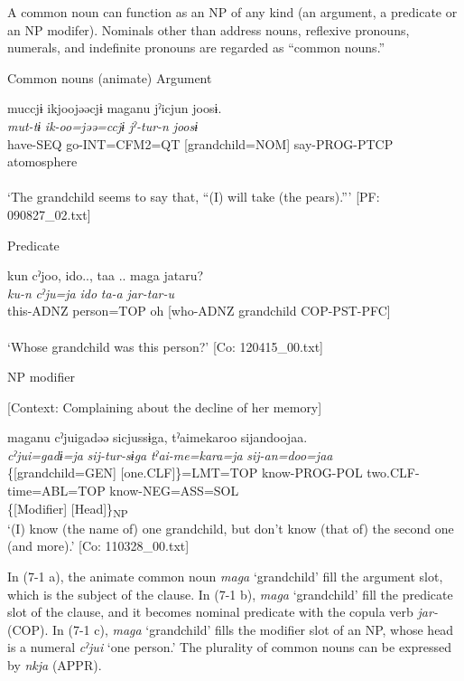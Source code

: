 A common noun can function as an NP of any kind (an argument, a predicate or an NP modifer). Nominals other than address nouns, reflexive pronouns, numerals, and indefinite pronouns are regarded as “common nouns.”

\ea \label{ex:7:1}  Common nouns (animate)
\ea \label{ex:7:a}Argument

\gllll  muccjɨ  ikjoojəəcjɨ  maganu  jˀicjun   joosɨ.\\
\textit{mut-tɨ}  \textit{ik-oo=jəə=ccjɨ}  \textit{}  \textit{jˀ-tur-n}   \textit{joosɨ}\\
have-SEQ  go-INT=CFM2=QT  [grandchild=NOM]  say-PROG-PTCP atomosphere\\
[Subject]  \\
\glt ‘The grandchild seems to say that, “(I) will take (the pears).”’ [PF: 090827\_02.txt]

\ex \label{ex:7:b}Predicate

\gllll  kun  cˀjoo,  ido..,  taa ..  maga   jataru?\\
\textit{ku-n}  \textit{cˀju=ja}  \textit{ido}  \textit{ta-a}  \textit{} \textit{jar-tar-u}\\
this-ADNZ  person=TOP  oh  [who-ADNZ  grandchild COP-PST-PFC]\\
[Nominal predicate]\\
\glt ‘Whose grandchild was this person?’ [Co: 120415\_00.txt]

\ex \label{ex:7:c}NP modifier

    [Context: Complaining about the decline of her memory]

\gllll  maganu  cˀjuigadəə  sicjussɨga,                                tˀaimekaroo  sijandoojaa.\\
\textit{}  \textit{cˀjui=gadɨ=ja}  \textit{sij-tur-sɨga}         \textit{tˀai-me=kara=ja}  \textit{sij-an=doo=jaa}\\
\{[grandchild=GEN]  [one.CLF]\}=LMT=TOP  know-PROG-POL                  two.CLF-time=ABL=TOP  know-NEG=ASS=SOL\\
\{[Modifier]  [Head]\}\textsubscript{NP}  \\
\glt ‘(I) know (the name of) one grandchild, but don’t know (that of) the second one (and more).’ [Co: 110328\_00.txt]
\z
\z

In (7-1 a), the animate common noun \textit{maga} ‘grandchild’ fill the argument slot, which is the subject of the clause. In (7-1 b), \textit{maga} ‘grandchild’ fill the predicate slot of the clause, and it becomes nominal predicate with the copula verb \textit{jar-} (COP). In (7-1 c), \textit{maga} ‘grandchild’ fills the modifier slot of an NP, whose head is a numeral \textit{cˀjui} ‘one person.’ The plurality of common nouns can be expressed by \textit{nkja} (APPR).

